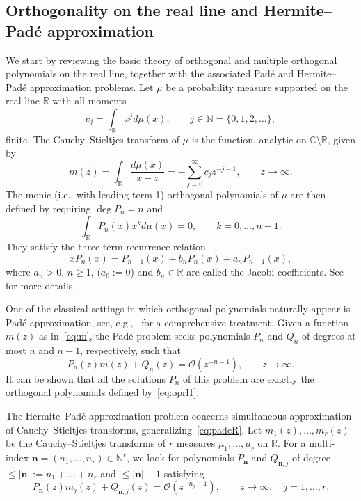 \documentclass[reqno,centertags,11pt,draft]{amsart}
\newcommand{\R}{\mathbb{R}}
\newcommand{\C}{\mathbb C}
\newcommand{\N}{\mathbb{N}}
\begin{document}
\subsection{Orthogonality on the real line and Hermite--Pad\'{e} approximation}\label{ss:intro1}

We start by reviewing the basic theory of orthogonal and multiple orthogonal polynomials on the real line, together with the associated Pad\'{e} and Hermite--Pad\'{e} approximation problems. 
Let $\mu$ be a probability measure supported on the real line $\R$ with all  moments 
$$
c_j = \int_\R x^j d\mu(x), \qquad j\in\N=\{0,1,2,\ldots\},
$$
finite. The Cauchy--Stieltjes transform of $\mu$ is the function, analytic on $\C\setminus\R$, given by
\begin{equation}
    \label{eq:m}
m(z) = \int_{\R} \frac{d\mu(x)}{x-z} = -\sum_{j=0}^\infty c_j z^{-j-1}, \qquad z\to\infty. 
\end{equation}
The monic (i.e., with leading term 1) orthogonal polynomials %
of $\mu$ are then defined by requiring $\deg{P_n} = n$ and
\begin{equation}\label{eq:oprl1}
    \int_\R P_n(x)x^{k} d\mu(x) = 0, \qquad k = 0,\dots,n-1.
\end{equation}
They satisfy the three-term recurrence relation
\begin{equation}
    x P_{n}(x) = P_{n+1}(x) + b_n P_n(x) + a_n P_{n-1}(x),
\end{equation}
where $a_n>0$, $n\ge 1$, ($a_0:=0$) and $b_n\in\R$ are called the Jacobi coefficients.
See~\cite{SzegoBook,SimonL2} for more details.

One of the classical settings in which orthogonal polynomials naturally appear is Pad\'{e} approximation, see, e.g.,~\cite{Baker} for a comprehensive treatment.
Given a function $m(z)$ as in~\eqref{eq:m}, the Pad\'{e} problem seeks polynomials $P_n$ and $Q_n$ of degrees at most $n$ and $n-1$, respectively, such that
\begin{equation}\label{eq:padeR}
P_n(z) m(z) +Q_n(z) = \mathcal{O}(z^{-n-1}), \qquad z \to \infty.
\end{equation}
It can be shown that all the %
solutions $P_n$ of %
this problem are exactly the orthogonal polynomials defined by~\eqref{eq:oprl1}.

The Hermite--Pad\'{e} approximation problem concerns simultaneous approximation of Cauchy--Stieltjes transforms, generalizing~\eqref{eq:padeR}. %
Let $m_1(z), \ldots, m_r(z)$ be the Cauchy--Stieltjes transforms of $r$ measures $\mu_1, \ldots, \mu_r$ on $\R$. For a multi-index $\bm{n} = (n_1, \ldots, n_r) \in \N^r$, we look for polynomials $P_{\bm{n}}$ and $Q_{\bm{n},j}$  of degree $\le |\bm{n}|:=n_1+\ldots+n_r$ and $\le |\bm{n}|-1$ satisfying
\begin{equation}\label{eq:hermitePadeR}
P_{\bm{n}}(z) m_j(z) + Q_{\bm{n},j}(z) = \mathcal{O}(z^{-n_j - 1}),
\qquad z \to \infty, \quad j = 1,\ldots,r.
\end{equation}
\end{document}
